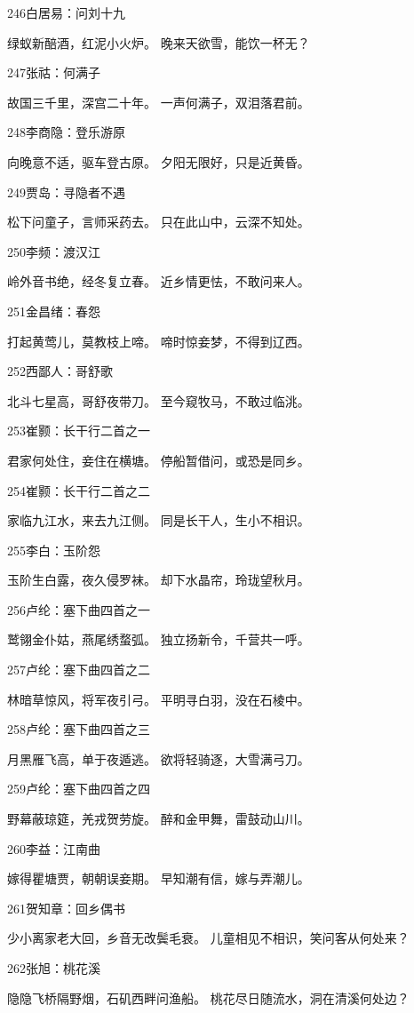 246白居易：问刘十九

绿蚁新醅酒，红泥小火炉。
晚来天欲雪，能饮一杯无？

247张祜：何满子

故国三千里，深宫二十年。
一声何满子，双泪落君前。

248李商隐：登乐游原

向晚意不适，驱车登古原。
夕阳无限好，只是近黄昏。

249贾岛：寻隐者不遇

松下问童子，言师采药去。
只在此山中，云深不知处。

250李频：渡汉江

岭外音书绝，经冬复立春。
近乡情更怯，不敢问来人。

251金昌绪：春怨

打起黄莺儿，莫教枝上啼。
啼时惊妾梦，不得到辽西。

252西鄙人：哥舒歌

北斗七星高，哥舒夜带刀。
至今窥牧马，不敢过临洮。

253崔颢：长干行二首之一

君家何处住，妾住在横塘。
停船暂借问，或恐是同乡。

254崔颢：长干行二首之二

家临九江水，来去九江侧。
同是长干人，生小不相识。

255李白：玉阶怨

玉阶生白露，夜久侵罗袜。
却下水晶帘，玲珑望秋月。

256卢纶：塞下曲四首之一

鹫翎金仆姑，燕尾绣蝥弧。
独立扬新令，千营共一呼。

257卢纶：塞下曲四首之二

林暗草惊风，将军夜引弓。
平明寻白羽，没在石棱中。

258卢纶：塞下曲四首之三

月黑雁飞高，单于夜遁逃。
欲将轻骑逐，大雪满弓刀。

259卢纶：塞下曲四首之四

野幕蔽琼筵，羌戎贺劳旋。
醉和金甲舞，雷鼓动山川。

260李益：江南曲

嫁得瞿塘贾，朝朝误妾期。
早知潮有信，嫁与弄潮儿。

261贺知章：回乡偶书

少小离家老大回，乡音无改鬓毛衰。
儿童相见不相识，笑问客从何处来？

262张旭：桃花溪

隐隐飞桥隔野烟，石矶西畔问渔船。
桃花尽日随流水，洞在清溪何处边？

